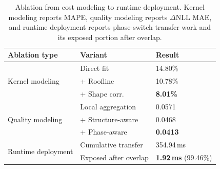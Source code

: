 \begin{table}[t]
\centering
\small
\setlength{\tabcolsep}{2pt}
\begin{tabular}{@{}lll@{}}
\toprule
Ablation type & Variant & Result \\
\midrule
\multirow{3}{*}{Kernel modeling} & Direct fit & 14.80\% \\
 & + Roofline & 10.78\% \\
 & + Shape corr. & \textbf{8.01\%} \\
\midrule
\multirow{3}{*}{Quality modeling} & Local aggregation & 0.0571 \\
 & + Structure-aware & 0.0468 \\
 & + Phase-aware & \textbf{0.0413} \\
\midrule
\multirow{2}{*}{Runtime deployment} & Cumulative transfer & 354.94\,ms \\
 & Exposed after overlap & \textbf{1.92\,ms} (99.46\%) \\
\bottomrule
\end{tabular}
\caption{Ablation from cost modeling to runtime deployment. Kernel modeling reports MAPE, quality modeling reports $\Delta\mathrm{NLL}$ MAE, and runtime deployment reports phase-switch transfer work and its exposed portion after overlap.}
\label{tab:modeling-ablation}
\end{table}

